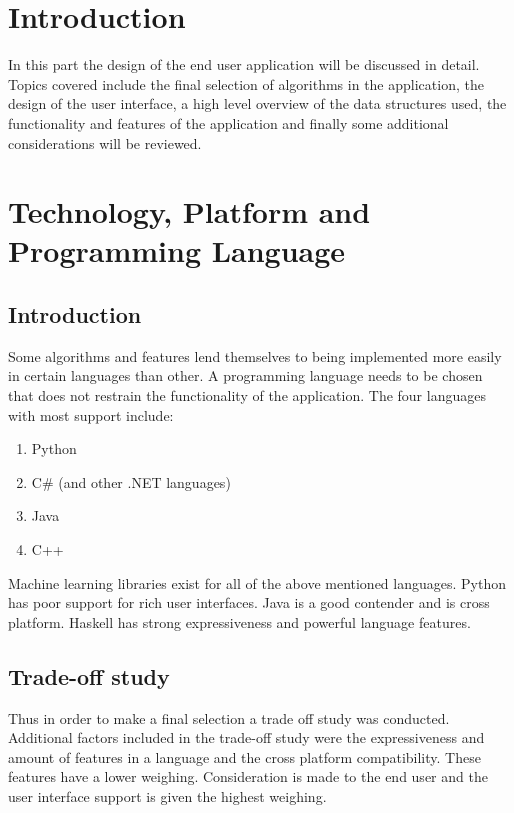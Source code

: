 

\chapter{Introduction}
In this part the design of the end user application will be discussed in detail. Topics covered include the final selection of algorithms in the application, the design of the user interface, a high level overview of the data structures used, the functionality and features of the application and finally some additional considerations will be reviewed.

\chapter{Technology, Platform and Programming Language}
\section{Introduction}
Some algorithms and features lend themselves to being implemented more easily in certain languages than other. A programming language needs to be chosen that does not restrain the functionality of the application. 
The four languages with most support include:
\begin{enumerate}
\item Python
\item C\# (and other .NET languages)
\item Java
\item C++
\end{enumerate}

Machine learning libraries exist for all of the above mentioned languages. Python has poor support for rich user interfaces. Java is a good contender and is cross platform. Haskell has strong expressiveness and powerful language features.

\section{Trade-off study}

Thus in order to make a final selection a trade off study was conducted. Additional factors included in the trade-off study were the expressiveness and amount of features in a language and the cross platform compatibility. These features have a lower weighing.
Consideration is made to the end user and the user interface support is given the highest weighing.  

